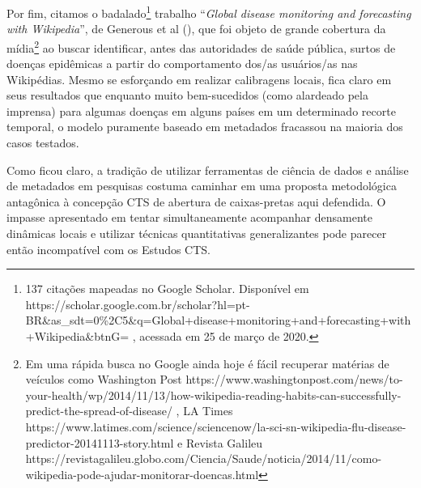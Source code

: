 Por fim, citamos o badalado\footnote{137 citações mapeadas no Google Scholar. Disponível em https://scholar.google.com.br/scholar?hl=pt-BR\&as\_sdt=0\%2C5\&q=Global+disease+monitoring+and+forecasting+with+Wikipedia\&btnG= , acessada em 25 de março de 2020.} trabalho “\textit{Global disease monitoring and forecasting with Wikipedia}”, de Generous et al (\citeyear{generous_global_2014}), que foi objeto de grande cobertura da mídia\footnote{Em uma rápida busca no Google ainda hoje é fácil recuperar matérias de veículos como Washington Post https://www.washingtonpost.com/news/to-your-health/wp/2014/11/13/how-wikipedia-reading-habits-can-successfully-predict-the-spread-of-disease/ , LA Times https://www.latimes.com/science/sciencenow/la-sci-sn-wikipedia-flu-disease-predictor-20141113-story.html e Revista Galileu https://revistagalileu.globo.com/Ciencia/Saude/noticia/2014/11/como-wikipedia-pode-ajudar-monitorar-doencas.html} ao buscar identificar, antes das autoridades de saúde pública, surtos de doenças epidêmicas a partir do comportamento dos/as usuários/as nas Wikipédias. Mesmo se esforçando em realizar calibragens locais, fica claro em seus resultados que enquanto muito bem-sucedidos (como alardeado pela imprensa) para algumas doenças em alguns países em um determinado recorte temporal, o modelo puramente baseado em metadados fracassou na maioria dos casos testados.

Como ficou claro, a tradição de utilizar ferramentas de ciência de dados e análise de metadados em pesquisas costuma caminhar em uma proposta metodológica antagônica à concepção CTS de abertura de caixas-pretas aqui defendida. O impasse apresentado em tentar simultaneamente acompanhar densamente dinâmicas locais e utilizar técnicas quantitativas generalizantes pode parecer então incompatível com os Estudos CTS.

